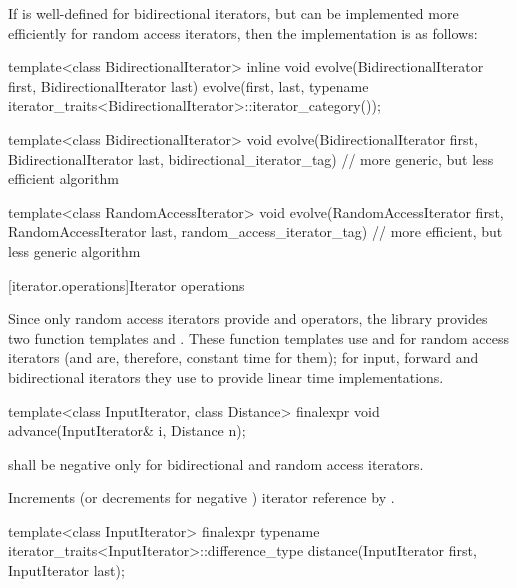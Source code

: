 \pnum
\begin{example}
If
is well-defined for bidirectional iterators, but can be implemented more
efficiently for random access iterators, then the implementation is as follows:

\begin{codeblock}
template<class BidirectionalIterator>
inline void
evolve(BidirectionalIterator first, BidirectionalIterator last) {
  evolve(first, last,
    typename iterator_traits<BidirectionalIterator>::iterator_category());
}

template<class BidirectionalIterator>
void evolve(BidirectionalIterator first, BidirectionalIterator last,
  bidirectional_iterator_tag) {
  // more generic, but less efficient algorithm
}

template<class RandomAccessIterator>
void evolve(RandomAccessIterator first, RandomAccessIterator last,
  random_access_iterator_tag) {
  // more efficient, but less generic algorithm
}
\end{codeblock}
\end{example}

[iterator.operations]{Iterator operations}

\pnum
Since only random access iterators provide
\tcode{+}
and
\tcode{-}
operators, the library provides two
function templates
and
.
These
function templates
use
\tcode{+}
and
\tcode{-}
for random access iterators (and are, therefore, constant
time for them); for input, forward and bidirectional iterators they use
\tcode{++}
to provide linear time
implementations.

%
\begin{itemdecl}
template<class InputIterator, class Distance>
  finalexpr void advance(InputIterator& i, Distance n);
\end{itemdecl}

\begin{itemdescr}
\pnum
\requires
{}
shall be negative only for bidirectional and random access iterators.

\pnum
\effects
Increments (or decrements for negative
)
iterator reference
by
.
\end{itemdescr}

%
\begin{itemdecl}
template<class InputIterator>
  finalexpr typename iterator_traits<InputIterator>::difference_type
    distance(InputIterator first, InputIterator last);
\end{itemdecl}

